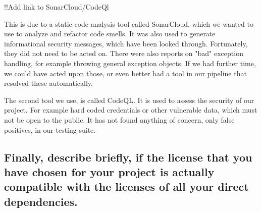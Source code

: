!!Add link to SonarCloud/CodeQl

This is due to a static code analysis tool called SonarCloud, which we wanted to use to analyze and refactor code smells.
It was also used to generate informational security messages, which have been looked through. Fortunately, they did not need to be acted on. 
There were also reports on "bad" exception handling, for example throwing general exception objects. 
If we had further time, we could have acted upon those, or even better had a tool in our pipeline that resolved these automatically.

The second tool we use, is called CodeQL. 
It is used to assess the security of our project. For example hard coded credentials or other vulnerable data, which must not be open to the public. 
It has not found anything of concern, only false positives, in our testing suite.

\subsection{Finally, describe briefly, if the license that you have chosen for your project is actually compatible with the licenses of all your direct dependencies.}
